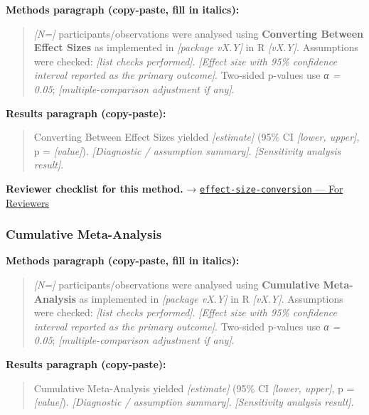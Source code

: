\documentclass[
]{article}
\begin{document}
\textbf{Methods paragraph (copy-paste, fill in italics):}

\begin{quote}
\emph{{[}N={]}} participants/observations were analysed using
\textbf{Converting Between Effect Sizes} as implemented in
\emph{{[}package vX.Y{]}} in R \emph{{[}vX.Y{]}}. Assumptions were
checked: \emph{{[}list checks performed{]}}. \emph{{[}Effect size with
95\% confidence interval reported as the primary outcome{]}}. Two-sided
p-values use \emph{α = 0.05}; \emph{{[}multiple-comparison adjustment if
any{]}}.
\end{quote}

\textbf{Results paragraph (copy-paste):}

\begin{quote}
Converting Between Effect Sizes yielded \emph{{[}estimate{]}} (95\% CI
\emph{{[}lower, upper{]}}, p = \emph{{[}value{]}}). \emph{{[}Diagnostic
/ assumption summary{]}}. \emph{{[}Sensitivity analysis result{]}}.
\end{quote}

\textbf{Reviewer checklist for this method.} →
\href{../chapters/15-metaanalysis/effect-size-conversion.Rmd\#for-reviewers}{\texttt{effect-size-conversion}
--- For Reviewers}

\subsubsection{Cumulative Meta-Analysis}\label{cumulative-meta-analysis}

\textbf{Methods paragraph (copy-paste, fill in italics):}

\begin{quote}
\emph{{[}N={]}} participants/observations were analysed using
\textbf{Cumulative Meta-Analysis} as implemented in \emph{{[}package
vX.Y{]}} in R \emph{{[}vX.Y{]}}. Assumptions were checked: \emph{{[}list
checks performed{]}}. \emph{{[}Effect size with 95\% confidence interval
reported as the primary outcome{]}}. Two-sided p-values use \emph{α =
0.05}; \emph{{[}multiple-comparison adjustment if any{]}}.
\end{quote}

\textbf{Results paragraph (copy-paste):}

\begin{quote}
Cumulative Meta-Analysis yielded \emph{{[}estimate{]}} (95\% CI
\emph{{[}lower, upper{]}}, p = \emph{{[}value{]}}). \emph{{[}Diagnostic
/ assumption summary{]}}. \emph{{[}Sensitivity analysis result{]}}.
\end{quote}
\end{document}
